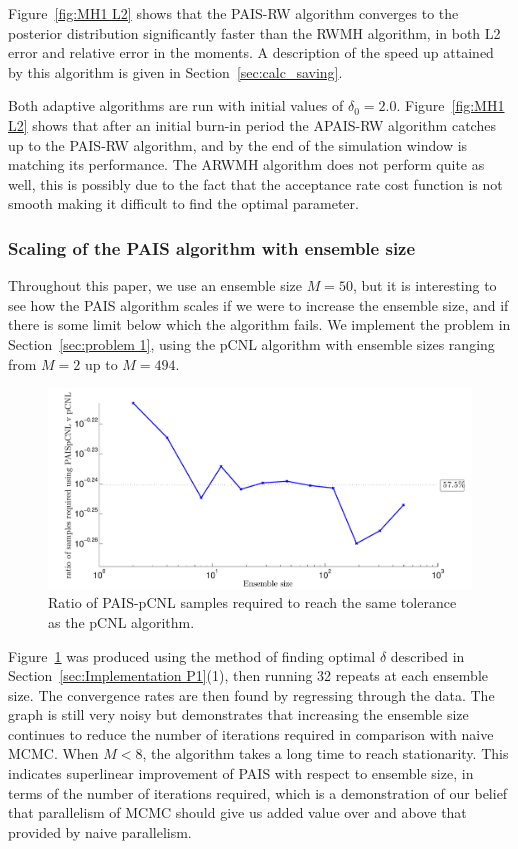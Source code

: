 \documentclass[final]{siamltex}
\begin{document}
Figure~\ref{fig:MH1 L2} shows that the PAIS-RW algorithm converges to the posterior distribution significantly faster than the RWMH algorithm, in both L2 error and relative error in the moments. A description of the speed up attained by this algorithm is given in Section~\ref{sec:calc_saving}.

Both adaptive algorithms are run with initial values of $\delta_0=2.0$. Figure~\ref{fig:MH1 L2} shows that after an initial burn-in period the APAIS-RW algorithm catches up to the PAIS-RW algorithm, and by the end of the simulation window is matching its performance. The ARWMH algorithm does not perform quite as well, this is possibly due to the fact that the acceptance rate cost function is not smooth making it difficult to find the optimal parameter.

\subsubsection{Scaling of the PAIS algorithm with ensemble size}

Throughout this paper, we use an ensemble size $M=50$, but it is interesting to see how the PAIS algorithm scales if we were to increase the ensemble size, and if there is some limit below which the algorithm fails. We implement the problem in Section~\ref{sec:problem 1}, using the pCNL algorithm with ensemble sizes ranging from $M=2$ up to $M=494$.

\begin{figure}[h]
\begin{center}
\includegraphics[width=\textwidth]{"figures/PAIS_saving"}
\caption{Ratio of PAIS-pCNL samples required to reach the same tolerance as the pCNL algorithm.}
\label{fig:PAIS_saving}
\end{center}
\end{figure}

Figure~\ref{fig:PAIS_saving} was produced using the method of finding
optimal $\delta$ described in Section~\ref{sec:Implementation P1}(1),
then running 32 repeats at each ensemble size. The convergence rates
are then found by regressing through the data. The graph is still very
noisy but demonstrates that increasing the ensemble size continues to
reduce the number of iterations required in comparison with naive
MCMC. When $M<8$, the algorithm takes a long time to reach
stationarity. This indicates superlinear improvement of PAIS with
respect to ensemble size, in terms of the number of iterations
required, which is a demonstration of our belief that parallelism of
MCMC should give us added value over and above that provided by naive parallelism.
\end{document}
